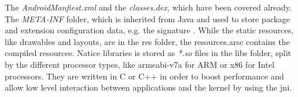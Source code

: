 The \textit{AndroidManfiest.xml} and the \textit{classes.dex}, which have been covered already.
The \textit{META-INF} folder, which is inherited from Java and used to store package and extension configuration data, e.g. the signature \cite{metaJava}.
While the static resources, like drawables and layouts, are in the res folder, the resources.arsc contains the compiled resources.
Natice libraries is stored as \textit{*.so} files in the libs folder, split by the different processor types, like armeabi-v7a for ARM or x86 for Intel processors.
They are written in C or C++ in order to boost performance and allow low level interaction between applications and the kernel by using the \gls{jni}. \cite{kovachevaMaster} \cite{ehringerDalvik}
